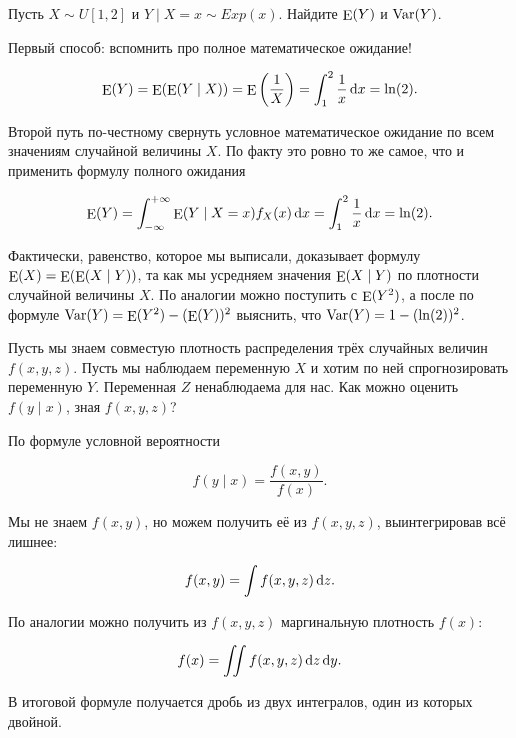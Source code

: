 \begin{problem}
Пусть $X \sim U[1,2]$ и  $Y \mid X=x \sim Exp(x)$. Найдите $\operatorname{\mathop{E}}(Y)$ и $\operatorname{Var}(Y)$. 

\begin{sol} 
Первый способ: вспомнить про полное математическое ожидание! 

\[ \operatorname{\mathop{E}}(Y) = \operatorname{\mathop{E}}(\operatorname{\mathop{E}}(Y \mid X)) = \operatorname{\mathop{E}}\left(\frac{1}{X}\right) = \int_1^2 \frac{1}{x} \,\mathrm{d}x = \ln(2). \]

Второй путь по-честному свернуть условное математическое ожидание по всем значениям случайной величины $X$. По факту это ровно то же самое, что и применить формулу полного ожидания

\[ \operatorname{\mathop{E}}(Y) = \int_{-\infty}^{+\infty} \operatorname{\mathop{E}}(Y \mid X = x) f_X(x) \,\mathrm{d}x = \int_1^2 \frac{1}{x} \,\mathrm{d}x = \ln(2).\]

Фактически, равенство,  которое мы выписали, доказывает формулу $\operatorname{\mathop{E}}(X) = \operatorname{\mathop{E}}(\operatorname{\mathop{E}}(X \mid Y))$, та как мы усредняем значения $\operatorname{\mathop{E}}(X \mid Y)$ по плотности случайной величины $X$. По аналогии можно поступить с $\operatorname{\mathop{E}}(Y^2)$, а после по формуле $\operatorname{Var}(Y) = \operatorname{\mathop{E}}(Y^2) - (\operatorname{\mathop{E}}(Y))^2$ выяснить, что $\operatorname{Var}(Y) = 1 - (\ln(2))^2$.
\end{sol} 
\end{problem}


\begin{problem} 
Пусть мы знаем совместую плотность распределения трёх случайных величин  $f(x,y,z)$.  Пусть мы наблюдаем переменную $X$ и хотим по ней спрогнозировать переменную $Y$. Переменная $Z$ ненаблюдаема для нас. Как можно оценить $f(y \mid x)$, зная $f(x,y,z)$? 

\begin{sol}
По формуле условной вероятности 

\[f(y \mid x) = \frac{f(x,y)}{f(x)}.\]

Мы не знаем $f(x,y)$, но можем получить её из $f(x,y,z)$, выинтегрировав всё лишнее: 

\[ f(x,y) = \int f(x,y,z) \,\mathrm{d}z. \]

По аналогии можно получить из $f(x,y,z)$ маргинальную плотность $f(x)$: 

\[ f(x) = \iint f(x,y,z) \,\mathrm{d}z\,\mathrm{d}y. \]

В итоговой формуле получается дробь из двух интегралов, один из которых двойной.  
\end{sol}
\end{problem}


